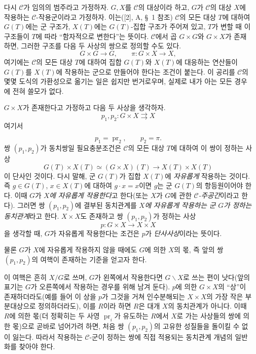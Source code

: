\documentclass[11pt,twoside,openany]{book}
\numberwithin{equation}{section}
\newcommand{\sourceunit}{front}
\newcommand{\src}[1]{%
  \phantomsection\hypertarget{src:\sourceunit:#1}{}%
  \marginpar{\raggedleft\footnotesize\sffamily #1}%
}
\theoremstyle{plain}
\theoremstyle{definition}
\theoremstyle{remark}
\begin{document}
다시 $\mathcal C$가 임의의 범주라고 가정하자. $G,X$를 $\mathcal C$의
대상이라 하고, $G$가 $\mathcal C$의 대상 $X$에 작용하는
$\mathcal C$-작용군이라고 가정하자. 이는([2], A, \S~1 참조) $\mathcal
C$의 모든 대상 $T$에 대하여 $G(T)$에는 군 구조가, $X(T)$에는
$G(T)$-집합 구조가 주어져 있고, $T$가 변할 때 이 구조들이 $T$에 따라
``함자적으로 변한다''는 뜻이다. $\mathcal C$에서 곱 $G\times G$와
$G\times X$가 존재하면, 그러한 구조를 다음 두 사상의 쌍으로 정의할
수도 있다.
\[
  G\times G\longrightarrow G,
  \qquad \pi:G\times X\longrightarrow X,
\]
여기에는 $\mathcal C$의 모든 대상 $T$에 대하여 집합 $G(T)$와 $X(T)$에
대응하는 연산들이 $G(T)$를 $X(T)$에 작용하는 군으로 만들어야 한다는
조건이 붙는다. 이 공리를 $\mathcal C$의 몇몇 도식의 가환성으로 옮기는
일은 쉽지만 번거로우며, 실제로 내가 아는 모든 경우에 전혀 쓸모가 없다.

$G\times X$가 존재한다고 가정하고 다음 두 사상을 생각하자.
\[
  p_1,p_2:G\times X\rightrightarrows X
\]
여기서
\src{105}
\[
  p_1=\operatorname{pr}_2,\qquad p_2=\pi.
\]
쌍 $(p_1,p_2)$가 동치쌍일 필요충분조건은 $\mathcal C$의 모든 대상
$T$에 대하여 이 쌍이 정하는 사상
\[
  G(T)\times X(T)\simeq(G\times X)(T)
  \longrightarrow X(T)\times X(T)
\]
이 단사인 것이다. 다시 말해, 군 $G(T)$가 집합 $X(T)$에
\emph{자유롭게} 작용하는 것이다. 즉 $g\in G(T)$, $x\in X(T)$에 대하여
$g\cdot x=x$이면 $g$는 군 $G(T)$의 항등원이어야 한다. 이때 $G$가
\emph{$X$에 자유롭게 작용한다}고 한다(또는 $X$가 $G$에 관한
\emph{$\mathcal C$-주공간}이라고 한다). 그러면 쌍 $(p_1,p_2)$에 결부된
동치관계를 \emph{$X$에 자유롭게 작용하는 군 $G$가 정하는 동치관계}라고
한다. $X\times X$도 존재하고 쌍 $(p_1,p_2)$가 정하는 사상
\[
  p:G\times X\longrightarrow X\times X
\]
을 생각할 때, $G$가 자유롭게 작용한다는 조건은 $p$가
\emph{단사사상}이라는 뜻이다.

물론 $G$가 $X$에 자유롭게 작용하지 않을 때에도 $G$에 의한 $X$의 몫,
즉 앞의 쌍 $(p_1,p_2)$의 여핵이 존재하는 기준을 얻고자 한다.

이 여핵은 흔히 $X/G$로 쓰며, $G$가 왼쪽에서 작용한다면 $G\backslash
X$로 쓰는 편이 낫다(앞의 표기는 $G$가 오른쪽에서 작용하는 경우를 위해
남겨 둔다). $p$에 의한 $G\times X$의 ``상''이 존재하더라도(예를 들어
이 상을 $p$가 그것을 거쳐 인수분해되는 $X\times X$의 가장 작은
부분대상으로 정의하더라도), 이를 $R$이라 하면 $R$은 대개 $X$의
동치관계가 아니다. 이때 $R$에 의한 몫(더 정확히는 두 사영
$\operatorname{pr}_i$가 유도하는 $R$에서 $X$로 가는 사상들의 쌍에 의한
몫)으로 곧바로 넘어가려 하면, 처음 쌍 $(p_1,p_2)$의 고유한 성질들을
돌이킬 수 없이 잃는다. 따라서 작용하는 $\mathcal C$-군이 정하는 쌍에
직접 적용되는 동치관계 개념의 일반화를 찾아야 한다.
\end{document}
